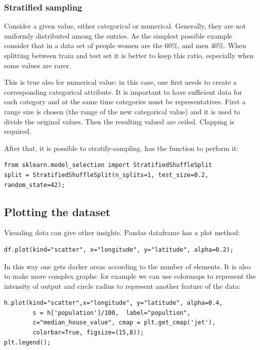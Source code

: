 \subsubsection{Stratified sampling}
Consider a given value, either categorical or numerical. Generally, they are not uniformly distributed among the entries. As the simplest possible example consider that in a data set of people women are the $60\%$, and men $40\%$. When splitting between train and test set it is better to keep this ratio, especially when some values are rarer.

This is true also for numerical value: in this case, one first needs to create a corresponding categorical attribute. It is important to have sufficient data for each category and at the same time categories must be representatives. First a range size is chosen (the range of the new categorical value) and it is used to divide the original values. Then the resulting valued are ceiled. Clapping is required.

After that, it is possible to stratify-sampling.  has the function  to perform it:
\begin{lstlisting}
from sklearn.model_selection import StratifiedShuffleSplit
split = StratifiedShuffleSplit(n_splits=1, test_size=0.2, random_state=42);
\end{lstlisting}

\subsection{Plotting the dataset}
Visualing data can give other insights.
Pandas dataframe has a plot method:
\begin{lstlisting}[caption=Example of Pandas dataframe plot method.]
df.plot(kind="scatter", x="longitude", y="latitude", alpha=0.2);
\end{lstlisting}
In this way one gets darker areas according to the number of elements.
It is also to make more complex graphs: for example we can use colormaps to represent the intensity of output and circle radius to represent another feature of the data:
\begin{lstlisting}[caption=Example of Pandas dataframe plot with colormap and variable radius of scattered circles.]
h.plot(kind="scatter",x="longitude", y="latitude", alpha=0.4, 
		s = h['population']/100,  label="popultion", 
		c="median_house_value", cmap = plt.get_cmap('jet'), 
		colorbar=True, figsize=(15,8));
plt.legend();
\end{lstlisting}


